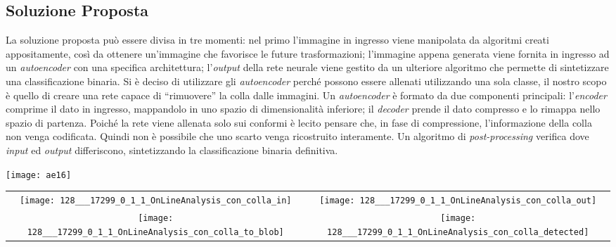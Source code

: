 \documentclass[a0,portrait]{a0poster}
\begin{document}
\begin{multicols}{2}
\subsection*{Soluzione Proposta}
La soluzione proposta può essere divisa in tre momenti:
nel primo l'immagine in ingresso viene manipolata da algoritmi creati appositamente, così da ottenere un'immagine che favorisce le future trasformazioni;
l'immagine appena generata viene fornita in ingresso ad un \textit{autoencoder} con una specifica architettura;
l'\textit{output} della rete neurale viene gestito da un ulteriore algoritmo che permette di sintetizzare una classificazione binaria.
Si è deciso di utilizzare gli \textit{autoencoder} perché possono essere allenati utilizzando una sola classe, il nostro scopo è quello di creare una rete capace di ``rimuovere'' la colla dalle immagini.
Un \textit{autoencoder} è formato da due componenti principali:
l'\textit{encoder} comprime il dato in ingresso, mappandolo in uno spazio di dimensionalità inferiore;
il \textit{decoder} prende il dato compresso e lo rimappa nello spazio di partenza.
Poiché la rete viene allenata solo sui conformi è lecito pensare che, in fase di compressione, l'informazione della colla non venga codificata.
Quindi non è possibile che uno scarto venga ricostruito interamente.
Un algoritmo di \textit{post-processing} verifica dove \textit{input} ed \textit{output} differiscono, sintetizzando la classificazione binaria definitiva.
\\
[1cm]
\begin{minipage}[c]{0.25\textwidth}
\centering\texttt{[image: ae16]}
    \label{ae}
\end{minipage}
\begin{minipage}[c]{0.29\textwidth}
  \centering
    \begin{tabular}{cc} \label{griglia_fig}
      \texttt{[image: 128\_\_\_17299\_0\_1\_1\_OnLineAnalysis\_con\_colla\_in]} &
      \texttt{[image: 128\_\_\_17299\_0\_1\_1\_OnLineAnalysis\_con\_colla\_out]} \\
      \texttt{[image: 128\_\_\_17299\_0\_1\_1\_OnLineAnalysis\_con\_colla\_to\_blob]} &
      \texttt{[image: 128\_\_\_17299\_0\_1\_1\_OnLineAnalysis\_con\_colla\_detected]}
    \end{tabular}
\end{minipage}



\end{multicols}
\end{document}
